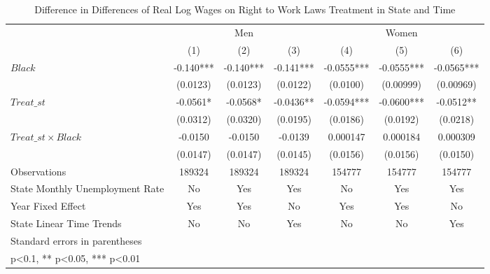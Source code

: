 \begin{table}[htbp]\centering
\def\sym#1{\ifmmode^{#1}\else\(^{#1}\)\fi}
\caption{Difference in Differences of Real Log Wages on Right to Work Laws Treatment in State and Time}
\begin{tabular}{l*{6}{c}}
\hline\hline
                    &\multicolumn{3}{c}{Men}                        &\multicolumn{3}{c}{Women}                      \\\cmidrule(lr){2-4}\cmidrule(lr){5-7}
                    &\multicolumn{1}{c}{(1)}   &\multicolumn{1}{c}{(2)}   &\multicolumn{1}{c}{(3)}   &\multicolumn{1}{c}{(4)}   &\multicolumn{1}{c}{(5)}   &\multicolumn{1}{c}{(6)}   \\
\hline
$ Black $           &      -0.140***&      -0.140***&      -0.141***&     -0.0555***&     -0.0555***&     -0.0565***\\
                    &    (0.0123)   &    (0.0123)   &    (0.0122)   &    (0.0100)   &   (0.00999)   &   (0.00969)   \\
[1em]
$ Treat\_{st} $      &     -0.0561*  &     -0.0568*  &     -0.0436** &     -0.0594***&     -0.0600***&     -0.0512** \\
                    &    (0.0312)   &    (0.0320)   &    (0.0195)   &    (0.0186)   &    (0.0192)   &    (0.0218)   \\
[1em]
$ Treat\_{st} \times Black $&     -0.0150   &     -0.0150   &     -0.0139   &    0.000147   &    0.000184   &    0.000309   \\
                    &    (0.0147)   &    (0.0147)   &    (0.0145)   &    (0.0156)   &    (0.0156)   &    (0.0150)   \\
\hline
Observations        &      189324   &      189324   &      189324   &      154777   &      154777   &      154777   \\
State Monthly Unemployment Rate&          No   &         Yes   &         Yes   &          No   &         Yes   &         Yes   \\
Year Fixed Effect   &         Yes   &         Yes   &          No   &         Yes   &         Yes   &          No   \\
State Linear Time Trends&          No   &          No   &         Yes   &          No   &          No   &         Yes   \\
\hline\hline
\multicolumn{7}{l}{\footnotesize Standard errors in parentheses}\\
\multicolumn{7}{l}{\footnotesize * p<0.1, ** p<0.05, *** p<0.01}\\
\end{tabular}
\end{table}
